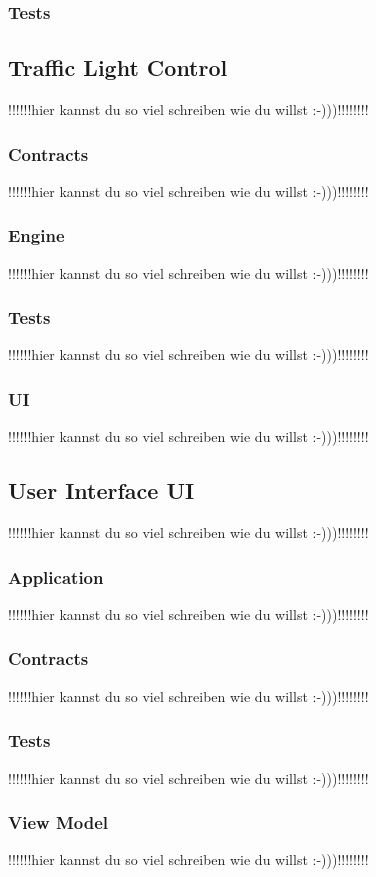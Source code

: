 \documentclass[12pt,a4paper,bibliography=totocnumbered,listof=totocnumbered]{scrartcl}
\begin{document}
\subsubsection{Tests}

\subsection{Traffic Light Control}
!!!!!!hier kannst du so viel schreiben wie du willst :-)))!!!!!!!!
\subsubsection{Contracts}
!!!!!!hier kannst du so viel schreiben wie du willst :-)))!!!!!!!!
\subsubsection{Engine}
!!!!!!hier kannst du so viel schreiben wie du willst :-)))!!!!!!!!
\subsubsection{Tests}
!!!!!!hier kannst du so viel schreiben wie du willst :-)))!!!!!!!!
\subsubsection{UI}
!!!!!!hier kannst du so viel schreiben wie du willst :-)))!!!!!!!!

\subsection{User Interface UI}
!!!!!!hier kannst du so viel schreiben wie du willst :-)))!!!!!!!!
\subsubsection{Application}
!!!!!!hier kannst du so viel schreiben wie du willst :-)))!!!!!!!!
\subsubsection{Contracts}
!!!!!!hier kannst du so viel schreiben wie du willst :-)))!!!!!!!!
\subsubsection{Tests}
!!!!!!hier kannst du so viel schreiben wie du willst :-)))!!!!!!!!
\subsubsection{View Model}
!!!!!!hier kannst du so viel schreiben wie du willst :-)))!!!!!!!!
\end{document}
